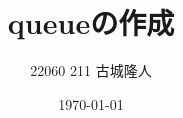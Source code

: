 \documentclass[dvipdfmx]{jsarticle}
\begin{document}
\title{queueの作成}
\author{22060 211 古城隆人}
\date{\today}
\maketitle


\end{document}
